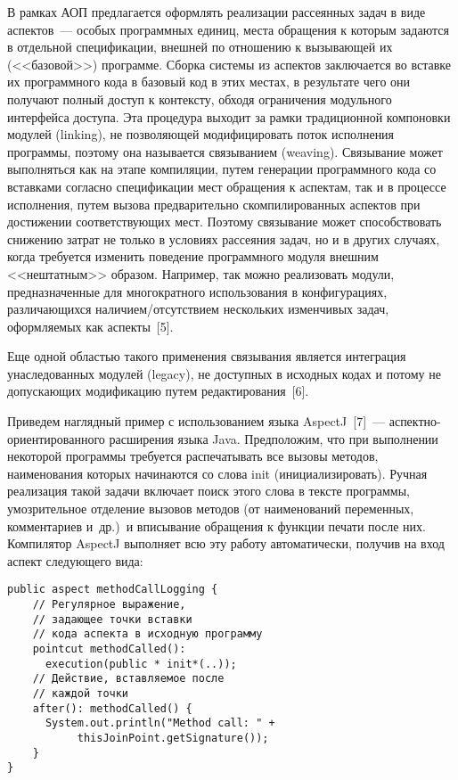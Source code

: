 \begin{multicols}{2}
   В рамках АОП предлагается оформлять реализации рассеянных задач в виде 
аспектов~--- особых программных единиц, места обращения к которым 
задаются в отдельной спецификации, внешней по отношению к вызывающей их 
(<<базовой>>) программе. Сборка сис\-те\-мы из аспектов заключается во 
вставке их программного кода в базовый код в этих местах, в результате чего 
они получают полный доступ к контексту, обходя ограничения модульного 
интерфейса доступа. Эта процедура выходит за рамки традиционной 
компоновки модулей (linking), не позволяющей модифицировать поток 
исполнения программы, поэтому она называется связыванием (weaving). 
Связывание может выполняться как на этапе компиляции, путем генерации 
программного кода со вставками согласно спецификации мест обращения к 
аспектам, так и в процессе исполнения, путем вызова предварительно 
скомпилированных аспектов при достижении соответствующих мест. Поэтому 
связывание может способствовать снижению за\-трат не только в условиях 
рассеяния задач, но и в других случаях, когда требуется изменить поведение 
программного модуля внешним <<нештатным>> образом. Например, так можно 
реализовать модули, предназначенные для многократного использования в 
конфигурациях, различающихся на\-ли\-чи\-ем/от\-сут\-ст\-ви\-ем нескольких изменчивых 
задач, оформляемых как аспекты~[5]. 

Еще одной областью такого применения 
связывания является интеграция унаследованных модулей (legacy), не 
доступных в исходных кодах и потому не допускающих модификацию путем 
редактирования~[6].
   
   Приведем наглядный пример с использованием языка AspectJ~[7]~--- 
   ас\-пект\-но-ори\-ен\-ти\-ро\-ван\-но\-го расширения языка Java. 
Предположим, что при выполнении некоторой программы требуется 
распечатывать все вызовы методов, наименования которых начинаются со 
слова {\sf init} (инициализировать). Ручная реализация такой задачи включает поиск 
этого слова в тексте программы, умозрительное отделение вызовов методов (от 
наименований переменных, комментариев и~др.)\ и вписывание обращения к 
функции печати после них. Компилятор AspectJ выполняет всю эту работу 
автоматически, получив на вход аспект следующего вида:
\begin{verbatim}
public aspect methodCallLogging {
    // Регулярное выражение, 
    // задающее точки вставки
    // кода аспекта в исходную программу
    pointcut methodCalled(): 
      execution(public * init*(..));
    // Действие, вставляемое после 
    // каждой точки
    after(): methodCalled() {
      System.out.println("Method call: " +
           thisJoinPoint.getSignature());
    }
}
\end{verbatim}


\end{multicols}

